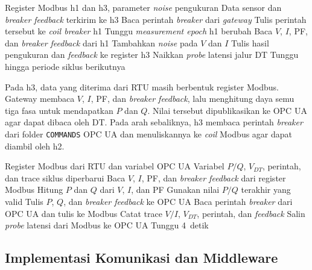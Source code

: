 \begin{algorithm}[H]
\caption{Siklus RTU pada h2}
\begin{compactalgorithmic}[1]
\Require Register Modbus h1 dan h3, parameter \textit{noise} pengukuran
\Ensure Data sensor dan \textit{breaker feedback} terkirim ke h3
\Loop
    \State Baca perintah \textit{breaker} dari \textit{gateway}
    \State Tulis perintah tersebut ke \textit{coil breaker} h1
    \State Tunggu \textit{measurement epoch} h1 berubah
        \State Baca $V$, $I$, PF, dan \textit{breaker feedback} dari h1
        \State Tambahkan \textit{noise} pada $V$ dan $I$
        \State Tulis hasil pengukuran dan \textit{feedback} ke register h3
    \EndFor
    \State Naikkan \textit{probe} latensi jalur \ac{DT}
    \State Tunggu hingga periode siklus berikutnya
\EndLoop
\end{compactalgorithmic}
\end{algorithm}

Pada h3, data yang diterima dari RTU masih berbentuk register Modbus. Gateway membaca $V$, $I$, PF, dan \textit{breaker feedback}, lalu menghitung daya semu tiga fasa untuk mendapatkan $P$ dan $Q$. Nilai tersebut dipublikasikan ke OPC UA agar dapat dibaca oleh \ac{DT}. Pada arah sebaliknya, h3 membaca perintah \textit{breaker} dari folder \texttt{COMMANDS} OPC UA dan menuliskannya ke \textit{coil} Modbus agar dapat diambil oleh h2.

\begin{algorithm}[H]
\caption{Siklus gateway Modbus--OPC UA pada h3}
\begin{compactalgorithmic}[1]
\Require Register Modbus dari RTU dan variabel OPC UA
\Ensure Variabel $P/Q$, $V_{DT}$, perintah, dan trace siklus diperbarui
\Loop
        \State Baca $V$, $I$, PF, dan \textit{breaker feedback} dari register Modbus
        \State Hitung $P$ dan $Q$ dari $V$, $I$, dan PF
            \State Gunakan nilai $P/Q$ terakhir yang valid
        \EndIf
        \State Tulis $P$, $Q$, dan \textit{breaker feedback} ke OPC UA
        \State Baca perintah \textit{breaker} dari OPC UA dan tulis ke Modbus
        \State Catat trace $V/I$, $V_{DT}$, perintah, dan \textit{feedback}
    \EndFor
    \State Salin \textit{probe} latensi dari Modbus ke OPC UA
    \State Tunggu 4~detik
\EndLoop
\end{compactalgorithmic}
\end{algorithm}

\subsection{Implementasi Komunikasi dan Middleware}
\label{subsec:implementasi_komunikasi_dan_middleware}

